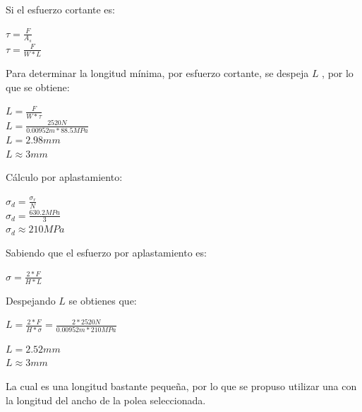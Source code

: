 Si el esfuerzo cortante es:

\begin{center}
	$\tau = \frac{F}{A_s}$\\
	$\tau = \frac{F}{W*L}$
\end{center}

Para determinar la longitud mínima, por esfuerzo cortante, se despeja $L$ , por lo que se obtiene:

\begin{center}
	$L = \frac{F}{W*\tau}$\\
	$L = \frac{2520 N}{0.00952 m * 88.5 MPa}$\\
	$L = 2.98 mm$ \\
	$L \approx 3 mm$
\end{center}


Cálculo por aplastamiento:

\begin{center}
	$\sigma_d = \frac{\sigma_r}{N}$ \\
	$\sigma_d = \frac{630.2 MPa}{3}$ \\
	$\sigma_d \approx 210 MPa$
\end{center}

Sabiendo que el esfuerzo por aplastamiento es:

\begin{center}
	$\sigma = \frac{2*F}{H*L}$
\end{center}

Despejando $L$ se obtienes que: 
\begin{center}
	$L = \frac{2*F}{H*\sigma} = \frac{2*2520 N}{0.00952 m * 210 MPa}$
 \end{center}
 \begin{center}
	$L = 2.52 mm$ \\
	$L \approx 3 mm$
\end{center}

La cual es una longitud bastante pequeña, por lo que se propuso utilizar una con la longitud del ancho de la polea seleccionada. 

